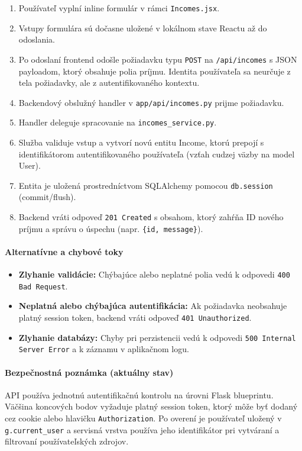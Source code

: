 \begin{enumerate}
    \item Používateľ vyplní inline formulár v rámci \texttt{Incomes.jsx}.
    \item Vstupy formulára sú dočasne uložené v lokálnom stave Reactu až do odoslania.
    \item Po odoslaní frontend odošle požiadavku typu \texttt{POST} na \texttt{/api/incomes}
    s JSON \mbox{payloadom}, ktorý obsahuje polia príjmu. Identita používateľa sa neurčuje z tela požiadavky, ale z autentifikovaného kontextu.
    \item Backendový obslužný handler v \texttt{app/api/incomes.py} prijme požiadavku.
    \item Handler deleguje spracovanie na \texttt{incomes\_service.py}.
    \item Služba validuje vstup a vytvorí novú entitu Income, ktorú prepojí
    s identifikátorom autentifikovaného používateľa (vzťah cudzej väzby na model User).
    \item Entita je uložená prostredníctvom SQLAlchemy pomocou \texttt{db.session}
    (commit/flush).
    \item Backend vráti odpoveď \texttt{201 Created} s obsahom, ktorý zahŕňa ID nového príjmu
    a správu o úspechu (napr. \texttt{\{id, message\}}).
\end{enumerate}

\paragraph{Alternatívne a chybové toky}
\begin{itemize}
    \item \textbf{Zlyhanie validácie:} Chýbajúce alebo neplatné polia vedú k odpovedi
    \texttt{400 Bad Request}.
    \item \textbf{Neplatná alebo chýbajúca autentifikácia:} Ak požiadavka neobsahuje platný
    session token, backend vráti odpoveď \texttt{401 Unauthorized}.
    \item \textbf{Zlyhanie databázy:} Chyby pri perzistencii vedú k odpovedi
    \texttt{500 Internal Server Error} a k záznamu v aplikačnom logu.
\end{itemize}

\paragraph{Bezpečnostná poznámka (aktuálny stav)}
API používa jednotnú autentifikačnú kontrolu na úrovni Flask blueprintu. Väčšina koncových bodov vyžaduje platný session token, ktorý môže byť dodaný cez cookie alebo hlavičku \texttt{Authorization}. Po overení je používateľ uložený v \texttt{g.current\_user} a servisná vrstva používa jeho identifikátor pri vytváraní a filtrovaní používateľských zdrojov.

